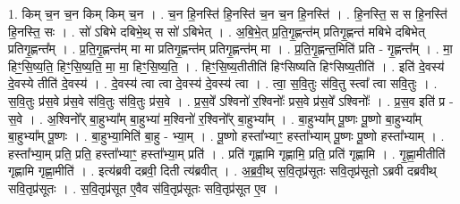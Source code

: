 \documentclass[17pt]{extarticle}
\begin{document}
1. किम् च॒न च॒न किम् किम् च॒न । . च॒न हि॒नस्ति॑ हि॒नस्ति॑ च॒न च॒न हि॒नस्ति॑ । . हि॒नस्ति॒ स स हि॒नस्ति॑ हि॒नस्ति॒ सः । . सो॑ ऽबिभे दबिभे॒थ् स सो॑ ऽबिभेत् । . अ॒बि॒भे॒त् प्र॒ति॒गृ॒ह्णन्त॑म् प्रतिगृ॒ह्णन्त॑ मबिभे दबिभेत् प्रतिगृ॒ह्णन्त᳚म् । . प्र॒ति॒गृ॒ह्णन्त॑म् मा मा प्रतिगृ॒ह्णन्त॑म् प्रतिगृ॒ह्णन्त॑म् मा । . प्र॒ति॒गृ॒ह्णन्त॒मिति॑ प्रति - गृ॒ह्णन्त᳚म् । . मा॒ हिꣳ॒॒सि॒ष्य॒ति॒ हिꣳ॒॒सि॒ष्य॒ति॒ मा॒ मा॒ हिꣳ॒॒सि॒ष्य॒ति॒ । . हिꣳ॒॒सि॒ष्य॒तीतीति॑ हिꣳसिष्यति हिꣳसिष्य॒तीति॑ । . इति॑ दे॒वस्य॑ दे॒वस्ये तीति॑ दे॒वस्य॑ । . दे॒वस्य॑ त्वा त्वा दे॒वस्य॑ दे॒वस्य॑ त्वा । . त्वा॒ स॒वि॒तुः स॑वि॒तु स्त्वा᳚ त्वा सवि॒तुः । . स॒वि॒तुः प्र॑स॒वे प्र॑स॒वे स॑वि॒तुः स॑वि॒तुः प्र॑स॒वे । . प्र॒स॒वे᳚ ऽश्विनो॑ र॒श्विनोः᳚ प्रस॒वे प्र॑स॒वे᳚ ऽश्विनोः᳚ । . प्र॒स॒व इति॑ प्र - स॒वे । . अ॒श्विनो᳚र् बा॒हुभ्या᳚म् बा॒हुभ्या॑ म॒श्विनो॑ र॒श्विनो᳚र् बा॒हुभ्या᳚म् । . बा॒हुभ्या᳚म् पू॒ष्णः पू॒ष्णो बा॒हुभ्या᳚म् बा॒हुभ्या᳚म् पू॒ष्णः । . बा॒हुभ्या॒मिति॑ बा॒हु - भ्या॒म् । . पू॒ष्णो हस्ता᳚भ्याꣳ॒॒ हस्ता᳚भ्याम् पू॒ष्णः पू॒ष्णो हस्ता᳚भ्याम् । . हस्ता᳚भ्या॒म् प्रति॒ प्रति॒ हस्ता᳚भ्याꣳ॒॒ हस्ता᳚भ्या॒म् प्रति॑ । . प्रति॑ गृह्णामि गृह्णामि॒ प्रति॒ प्रति॑ गृह्णामि । . गृ॒ह्णा॒मीतीति॑ गृह्णामि गृह्णा॒मीति॑ । . इत्य॑ब्रवी दब्रवी॒ दिती त्य॑ब्रवीत् । . अ॒ब्र॒वी॒थ् स॒वि॒तृप्र॑सूतः सवि॒तृप्र॑सूतो ऽब्रवी दब्रवीथ् सवि॒तृप्र॑सूतः । . स॒वि॒तृप्र॑सूत ए॒वैव स॑वि॒तृप्र॑सूतः सवि॒तृप्र॑सूत ए॒व । \newline
\end{document}
